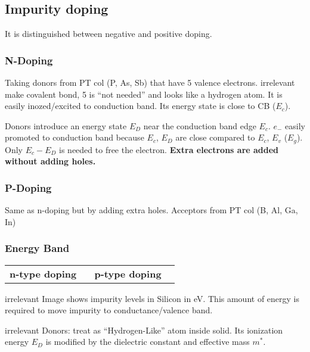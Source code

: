 \documentclass[a4paper, fontsize=8pt, landscape, DIV=1]{scrartcl}
\newcommand{\makeultracompact}{irrelevant}
\begin{document}
\begin{multicols*}{4}
  \subsection{Impurity doping}
  It is distinguished between negative and positive doping.
  
  \subsubsection{N-Doping}
  Taking donors from PT col  (P, As, Sb) that have 5 valence electrons.
  \ifdefined\makeultracompact{} make covalent bond, 5 is ``not needed'' and looks like a hydrogen atom.
    It is easily inozed/excited to conduction band. Its energy state is close to CB ($E_c$).
    \attention

    Donors introduce an energy state $E_D$ near the conduction band edge $E_c$.
    $e_-$ easily promoted to conduction band because $E_c$, $E_D$ are close compared to $E_c$, $E_v$ ($E_g$).
    Only $E_c-E_D$ is needed to free the electron. \textbf{Extra electrons are added without adding holes.}
  \fi

  \subsubsection{P-Doping}
  Same as n-doping but by adding extra holes. Acceptors from PT col  (B, Al, Ga, In)

  \subsubsection{Energy Band}
    \begin{tabular}[h]{p{0.45\linewidth} | p{0.45\linewidth}}
    \textbf{n-type doping} & \textbf{p-type doping} \\
  \end{tabular}

  
  \ifdefined\makeultracompact\else
    Image shows impurity levels in Silicon in eV. 
    This amount of energy is required to move impurity to conductance/valence band.
  \fi
  
  \ifdefined\makeultracompact\else
    Donors: treat as ``Hydrogen-Like'' atom inside solid. Its ionization energy $E_D$ is modified by the dielectric constant and effective mass $m^*$.


\end{multicols*}
\end{document}
